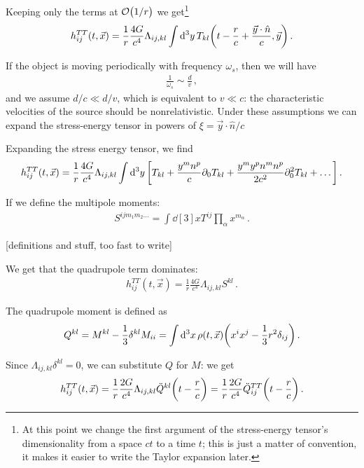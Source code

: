 \documentclass[main.tex]{subfiles}
\begin{document}
Keeping only the terms at \(\order{1/r}\) we get\footnote{At this point we change the first argument of the stress-energy tensor's dimensionality from a space \(ct\) to a time \(t\); this is just a matter of convention, it makes it easier to write the Taylor expansion later. }
%
\begin{align}
h_{ij}^{TT} (t, \vec{x}) = \frac{1}{r} \frac{4G}{c^{4}}
\Lambda_{ij, kl} \int \dd[3]{y} 
T_{kl} \qty(t - \frac{r}{c} + \frac{\vec{y} \cdot \hat{n}}{c}, \vec{y})
\,.
\end{align}

If the object is moving periodically with frequency \(\omega_s \), then we will have 
%
\begin{align}
\frac{1}{\omega_s } \sim \frac{d}{v}
\,,
\end{align}
%
and we assume \(d/c \ll d/v\), which is equivalent to \(v \ll c\): the characteristic velocities of the source should be nonrelativistic. 
Under these assumptions we can expand the stress-energy tensor in powers of \(\xi = \vec{y} \cdot \hat{n} / c\)


Expanding the stress energy tensor, we find 
%
\begin{align}
h_{ij}^{TT} (t, \vec{x}) = \frac{1}{r} \frac{4G}{c^{4}} \Lambda_{ij, kl} \int \dd[3]{y}\qty[T_{kl} + \frac{y^{m} n^{p}}{c} \partial_0 T_{kl}  + \frac{y^{m} y^{p} n^{m} n^{p}}{2c^2} \partial_0^2 T_{kl} + \dots]
\,.
\end{align}

If we define the multipole moments: 
%
\begin{align}
S^{ij m_1 m_2 \dots} = \int \dd[3]{x} T^{ij} \prod_\alpha  x^{m_\alpha }
\,.
\end{align}

[definitions and stuff, too fast to write]

We get that the quadrupole term dominates: 
%
\begin{align}
h_{ij}^{TT} (t, \vec{x}) = \frac{1}{r} \frac{4G}{c^{4}}
\Lambda_{ij, kl} S^{kl}
\,.
\end{align}

The quadrupole moment is defined as 
%
\begin{align}
Q^{kl} = M^{kl} - \frac{1}{3} \delta^{kl} M_{ii} 
= \int \dd[3]{x} \rho (t, \vec{x}) \qty(x^{i} x^{j} - \frac{1}{3} r^2 \delta_{ij})
\,.
\end{align}

Since \(\Lambda_{ij, kl} \delta^{kl} =0 \), we can substitute \(Q\) for \(M\): we get 
%
\begin{align}
h_{ij}^{TT} (t, \vec{x}) = \frac{1}{r} \frac{2G}{c^{4}}
\Lambda_{ij, kl} \ddot{Q}^{kl} \qty(t - \frac{r}{c})
= \frac{1}{r} \frac{2G}{c^{4}} \ddot{Q}^{TT}_{ij} \qty(t - \frac{r}{c})
\,.
\end{align}
\end{document}
